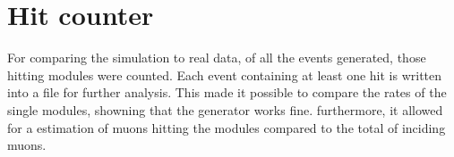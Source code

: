   \section{Hit counter}
  \label{ch:Simulation software:sec:Hit counter}
  
  For comparing the simulation to real data, of all the events generated, those hitting modules were counted. Each event containing at least one hit is written into a file for further analysis. This made it possible to compare the rates of the single modules, showning that the generator works fine. furthermore, it allowed for a estimation of muons hitting the modules compared to the total of inciding muons.
  